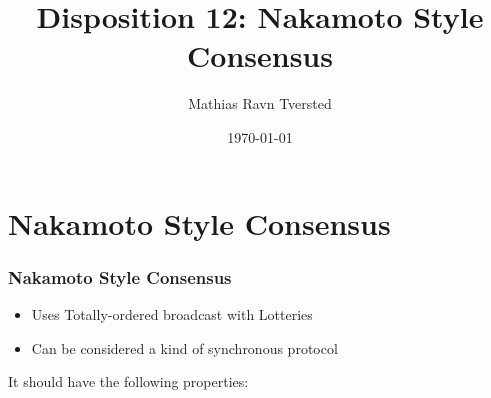 
\title{Disposition 12: Nakamoto Style Consensus}   
\author{Mathias Ravn Tversted} 
\date{\today} 




\frame{\titlepage} 









\section{Nakamoto Style Consensus}
    \begin{frame}
        \frametitle{Nakamoto Style Consensus}
           \begin{itemize}
              \item Uses Totally-ordered broadcast with Lotteries
              \item Can be considered a kind of synchronous protocol
           \end{itemize} 
           It should have the following properties:
    \end{frame}


